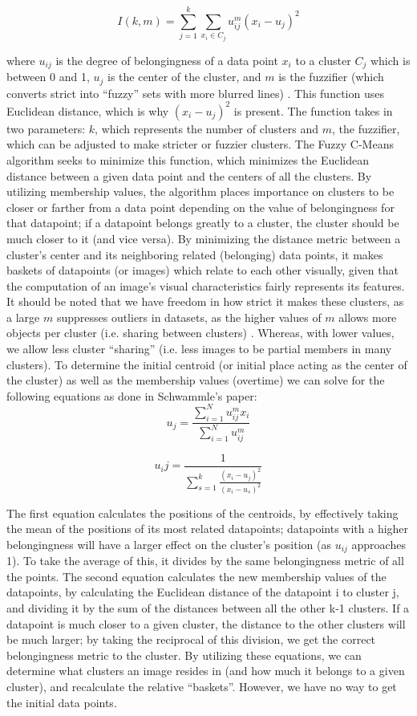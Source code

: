 \documentclass[10pt,twocolumn]{article}
\begin{document}
\[ I(k, m)  =  \sum_{j=1}^{k} \sum_{x_i \in C_j} u_{ij}^{m}(x_i - u_j)^2 \]

where \(u_{ij}\) is the degree of belongingness of a data point \(x_i \) to a cluster \(C_j \) which is between 0 and 1, \(u_j \) is the center of the cluster, and \(m \) is the fuzzifier (which converts strict into “fuzzy” sets with more blurred lines) \cite{PrasadClustering}. This function uses Euclidean distance, which is why \((x_i - u_j)^2 \) is present. The function takes in two parameters: \(k\), which represents the number of clusters and \(m \), the fuzzifier, which can be adjusted to make stricter or fuzzier clusters. The Fuzzy C-Means algorithm seeks to minimize this function, which minimizes the Euclidean distance between a given data point and the centers of all the clusters. By utilizing membership values, the algorithm places importance on clusters to be closer or farther from a data point depending on the value of belongingness for that datapoint; if a datapoint belongs greatly to a cluster, the cluster should be much closer to it (and vice versa). By minimizing the distance metric between a cluster’s center and its neighboring related (belonging) data points, it makes baskets of datapoints (or images) which relate to each other visually, given that the computation of an image's visual characteristics fairly represents its features. It should be noted that we have freedom in how strict it makes these clusters, as a large \(m \) suppresses outliers in datasets, as the higher values of \(m \) allows more objects per cluster (i.e. sharing between clusters) \cite{Schwammle2010}. Whereas, with lower values, we allow less cluster “sharing” (i.e. less images to be partial members in many clusters). To determine the initial centroid (or initial place acting as the center of the cluster) as well as the membership values (overtime) we can solve for the following equations as done in Schwammle’s paper: 
\[u_j = \frac{\sum_{i=1}^N u_{ij}^m x_i}{\sum_{i=1}^Nu_{ij}^m}\] 

\[u_ij = \frac{1}{\sum_{s=1}^k \frac{(x_i - u_j)^2}{(x_i - u_s)^2} }\] 

The first equation calculates the positions of the centroids, by effectively taking the mean of the positions of its most related datapoints; datapoints with a higher belongingness will have a larger effect on the cluster's position (as \(u_{ij}\) approaches 1). To take the average of this, it divides by the same belongingness metric of all the points.
The second equation calculates the new membership values of the datapoints, by calculating the Euclidean distance of the datapoint i to cluster j, and dividing it by the sum of the distances between all the other k-1 clusters. If a datapoint is much closer to a given cluster, the distance to the other clusters will be much larger; by taking the reciprocal of this division, we get the correct belongingness metric to the cluster. By utilizing these equations, we can determine what clusters an image resides in (and how much it belongs to a given cluster), and recalculate the relative “baskets”. However, we have no way to get the initial data points.
\end{document}
